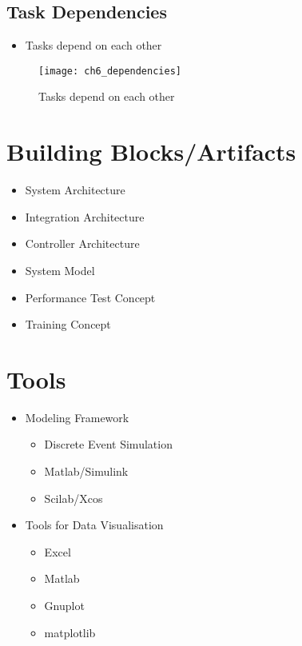\subsection{Task Dependencies}

\begin{itemize}
	\item Tasks depend on each other
\end{itemize}

\begin{figure}
	[htpb] \centering 
	\texttt{[image: ch6\_dependencies]} 
	\caption{Tasks depend on each other} 
	\label{fig:ch6_dependencies} 
\end{figure}

\section{Building Blocks/Artifacts}

\begin{itemize}
	\item System Architecture
	\item Integration Architecture
	\item Controller Architecture
	\item System Model
	\item Performance Test Concept
	\item Training Concept
\end{itemize}

\section{Tools} %
\label{sec:ch6_tools}

\begin{itemize}
	\item Modeling Framework
	\begin{itemize}
		\item Discrete Event Simulation
		\item Matlab/Simulink
		\item Scilab/Xcos
	\end{itemize}
	\item Tools for Data Visualisation
	\begin{itemize}
		\item Excel
		\item Matlab
		\item Gnuplot
		\item matplotlib
	\end{itemize}
\end{itemize}

